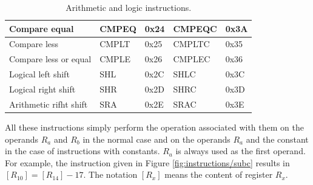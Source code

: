 \begin{table}[H]
\begin{tabular}{|l|l|l|l|l|}
    Compare equal                                               & CMPEQ                                                           & 0x24                                                         & CMPEQC                                                                & 0x3A                                                               \\ \hline
    Compare less                                                & CMPLT                                                           & 0x25                                                         & CMPLTC                                                                & 0x35                                                               \\ \hline
    Compare less or equal                                       & CMPLE                                                           & 0x26                                                         & CMPLEC                                                                & 0x36                                                               \\ \hline
    Logical left shift                                          & SHL                                                             & 0x2C                                                         & SHLC                                                                  & 0x3C                                                               \\ \hline
    Logical right shift                                         & SHR                                                             & 0x2D                                                         & SHRC                                                                  & 0x3D                                                               \\ \hline
    Arithmetic rifht shift                                      & SRA                                                             & 0x2E                                                         & SRAC                                                                  & 0x3E                                                               \\ \hline
    \end{tabular}
    \caption{Arithmetic and logic instructions.}
    \label{tab:instruction/alu}
\end{table}

All these instructions simply perform the operation associated with them on the operands $R_a$ and 
$R_b$ in the normal case and on the operands $R_a$ and the constant in the case of instructions 
with constants. $R_a$ is always used as the first operand. For example, the instruction given 
in Figure \ref{fig:instructions/subc} results in $[R_{10}] = [R_{14}] - 17$. The notation 
$[R_x]$ means the content of register $R_x$.

